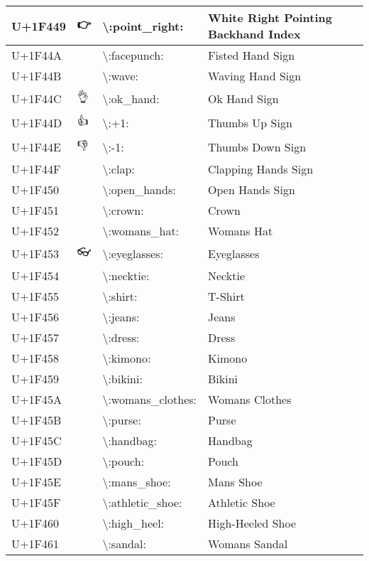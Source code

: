 \begin{table}[h]
\begin{tabulary}{\linewidth}{|L|L|L|L|}
U+1F449 & 👉 & {\textbackslash}:point\_right: & White Right Pointing Backhand Index \\
\hline
U+1F44A & 👊 & {\textbackslash}:facepunch: & Fisted Hand Sign \\
\hline
U+1F44B & 👋 & {\textbackslash}:wave: & Waving Hand Sign \\
\hline
U+1F44C & 👌 & {\textbackslash}:ok\_hand: & Ok Hand Sign \\
\hline
U+1F44D & 👍 & {\textbackslash}:+1: & Thumbs Up Sign \\
\hline
U+1F44E & 👎 & {\textbackslash}:-1: & Thumbs Down Sign \\
\hline
U+1F44F & 👏 & {\textbackslash}:clap: & Clapping Hands Sign \\
\hline
U+1F450 & 👐 & {\textbackslash}:open\_hands: & Open Hands Sign \\
\hline
U+1F451 & 👑 & {\textbackslash}:crown: & Crown \\
\hline
U+1F452 & 👒 & {\textbackslash}:womans\_hat: & Womans Hat \\
\hline
U+1F453 & 👓 & {\textbackslash}:eyeglasses: & Eyeglasses \\
\hline
U+1F454 & 👔 & {\textbackslash}:necktie: & Necktie \\
\hline
U+1F455 & 👕 & {\textbackslash}:shirt: & T-Shirt \\
\hline
U+1F456 & 👖 & {\textbackslash}:jeans: & Jeans \\
\hline
U+1F457 & 👗 & {\textbackslash}:dress: & Dress \\
\hline
U+1F458 & 👘 & {\textbackslash}:kimono: & Kimono \\
\hline
U+1F459 & 👙 & {\textbackslash}:bikini: & Bikini \\
\hline
U+1F45A & 👚 & {\textbackslash}:womans\_clothes: & Womans Clothes \\
\hline
U+1F45B & 👛 & {\textbackslash}:purse: & Purse \\
\hline
U+1F45C & 👜 & {\textbackslash}:handbag: & Handbag \\
\hline
U+1F45D & 👝 & {\textbackslash}:pouch: & Pouch \\
\hline
U+1F45E & 👞 & {\textbackslash}:mans\_shoe: & Mans Shoe \\
\hline
U+1F45F & 👟 & {\textbackslash}:athletic\_shoe: & Athletic Shoe \\
\hline
U+1F460 & 👠 & {\textbackslash}:high\_heel: & High-Heeled Shoe \\
\hline
U+1F461 & 👡 & {\textbackslash}:sandal: & Womans Sandal \\

\end{tabulary}
\end{table}
